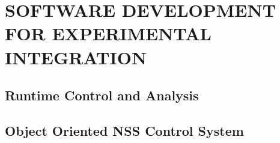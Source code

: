 

\chapter{SOFTWARE DEVELOPMENT FOR EXPERIMENTAL INTEGRATION}
\label{chap:SoftwareDevelopmentforExperimentalIntegration}


\section{Runtime Control and Analysis}
\label{sec:RuntimeControlandAnalysis}


\section{Object Oriented NSS Control System}
\label{sec:ObjectOrientedNSSControlSystem}

